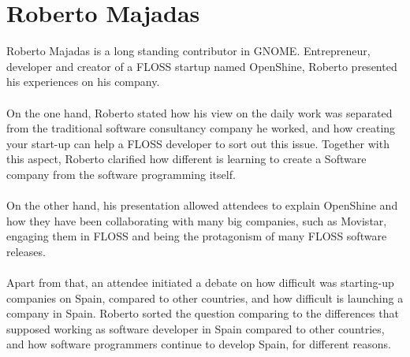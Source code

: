\documentclass[11pt]{article}
\begin{document}
\section{Roberto Majadas}
  Roberto Majadas is a long standing contributor in GNOME. Entrepreneur, developer and creator of a FLOSS startup named OpenShine, Roberto presented his experiences on his company.\\
\\
  On the one hand, Roberto stated how his view on the daily work was separated from the traditional software consultancy company he worked, and how creating your start-up can help a FLOSS developer to sort out this issue. Together with this aspect, Roberto clarified how different is learning to create a Software company from the software programming itself.\\
\\
  On the other hand, his presentation allowed attendees to explain OpenShine and how they have been collaborating with many big companies, such as Movistar, engaging them in FLOSS and being the protagonism of many FLOSS software releases.\\
\\
  Apart from that, an attendee initiated a debate on how difficult was starting-up companies on Spain, compared to other countries, and how difficult is launching a company in Spain. Roberto sorted the question comparing to the differences that supposed working as software developer in Spain compared to other countries, and how software programmers continue to develop Spain, for different reasons.
\end{document}
